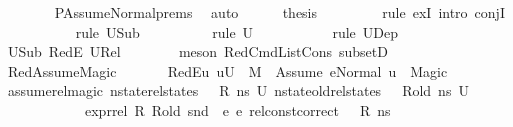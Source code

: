 \begin{isabellebody}
\ \ \ \ \ \ \isamarkupfalse%
\ PAssumeNormal{\isachardot}{\kern0pt}prems\ \isamarkupfalse%
\ auto\isanewline
\ \ \ \ \isamarkupfalse%
\ {\isacharquery}{\kern0pt}thesis\ \isanewline
\ \ \ \ \ \ \isamarkupfalse%
\ {\isacharparenleft}{\kern0pt}rule\ exI{\isacharcomma}{\kern0pt}\ intro\ conjI{\isacharparenright}{\kern0pt}\isanewline
\ \ \ \ \ \ \ \ \ \isamarkupfalse%
\ {\isacharparenleft}{\kern0pt}rule\ U{}Sub{\isacharparenright}{\kern0pt}\isanewline
\ \ \ \ \ \ \ \ \isamarkupfalse%
\ {\isacharparenleft}{\kern0pt}rule\ {\isacartoucheopen}U{}\ {\isasymnoteq}\ {\isacharbraceleft}{\kern0pt}{\isacharbraceright}{\kern0pt}{\isacartoucheclose}{\isacharparenright}{\kern0pt}\isanewline
\ \ \ \ \ \ \ \isamarkupfalse%
\ {\isacharparenleft}{\kern0pt}rule\ U{}Dep{\isacharparenright}{\kern0pt}\isanewline
\ \ \ \ \ \ \isamarkupfalse%
\ U{}Sub\ RedE{}\ U{}Rel\isanewline
\ \ \ \ \ \ \isamarkupfalse%
\ {\isacharparenleft}{\kern0pt}meson\ RedCmdListCons\ subsetD{\isacharparenright}{\kern0pt}\ \ \isanewline
\ \ \isamarkupfalse%
\isanewline
\ \ \ \ \isamarkupfalse%
\ RedAssumeMagic\isanewline
\ \ \ \ \isamarkupfalse%
\ \ RedE{}{\isacharcolon}{\kern0pt}{\isachardoublequoteopen}{\isasymAnd}u{\isachardot}{\kern0pt}\ u{\isasymin}U{}\ {\isasymLongrightarrow}\ M{\isacharcomma}{\kern0pt}{\isasymLambda}{\isacharprime}{\kern0pt}{\isacharcomma}{\kern0pt}{\isasymGamma}{\isacharcomma}{\kern0pt}{\isasymOmega}\ {\isasymturnstile}\ {\isasymlangle}Assume\ e{}{\isacharcomma}{\kern0pt}Normal\ u{\isasymrangle}\ {\isasymrightarrow}\ Magic{\isachardoublequoteclose}\isanewline
\ \ \ \ \ \ \isamarkupfalse%
\ assume{\isacharunderscore}{\kern0pt}rel{\isacharunderscore}{\kern0pt}magic\ {\isacartoucheopen}nstate{\isacharunderscore}{\kern0pt}rel{\isacharunderscore}{\kern0pt}states\ {\isasymLambda}\ {\isasymLambda}{\isacharprime}{\kern0pt}\ R\ ns\ U{}{\isacartoucheclose}\ {\isacartoucheopen}nstate{\isacharunderscore}{\kern0pt}old{\isacharunderscore}{\kern0pt}rel{\isacharunderscore}{\kern0pt}states\ {\isasymLambda}\ {\isasymLambda}{\isacharprime}{\kern0pt}\ R{\isacharunderscore}{\kern0pt}old\ ns\ U{}{\isacartoucheclose}\isanewline
\ \ \ \ \ \ \ \ \ \ \ \ {\isacartoucheopen}expr{\isacharunderscore}{\kern0pt}rel\ R\ R{\isacharunderscore}{\kern0pt}old\ {\isacharparenleft}{\kern0pt}snd\ {\isasymLambda}{\isacharparenright}{\kern0pt}\ e{}\ e{}{\isacartoucheclose}\ {\isacartoucheopen}rel{\isacharunderscore}{\kern0pt}const{\isacharunderscore}{\kern0pt}correct\ {\isasymLambda}\ {\isasymOmega}\ R\ ns{\isacartoucheclose}\ \isamarkupfalse%

\end{isabellebody}
